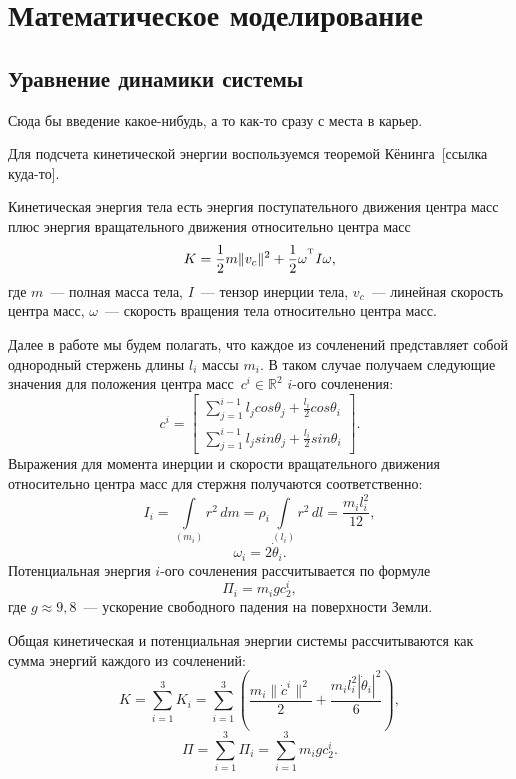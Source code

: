 \section{Математическое моделирование}

\subsection{Уравнение динамики системы}

{\color{red} Сюда бы введение какое-нибудь, а то как-то сразу с места в карьер.}

Для подсчета кинетической энергии воспользуемся теоремой Кёнинга~[ссылка куда-то].
\begin{theorem}[Кёнинг]
    Кинетическая энергия тела есть энергия поступательного движения центра масс плюс энергия вращательного движения относительно центра масс
    \begin{equation}\label{eq:kin-energy}
        K = \frac{1}{2} m \|v_c\|^2 + \frac{1}{2}\omega^{^\mathrm{T}} I \omega,
    \end{equation}
    где $m$~--- полная масса тела, $I$~--- тензор инерции тела, $v_c$~--- линейная скорость центра масс, $\omega$~--- скорость вращения тела относительно центра масс.
\end{theorem}

Далее в работе мы будем полагать, что каждое из сочленений представляет собой однородный стержень длины $l_i$ массы $m_i$.
В таком случае получаем следующие значения для положения центра масс~$c^i \in \mathbb{R}^2$ $i$-ого сочленения:
$$
    c^i =
    \left[\begin{aligned}
        \sum_{j=1}^{i-1} l_j cos\theta_j + \frac{l_i}{2}cos\theta_i \\
        \sum_{j=1}^{i-1} l_j sin\theta_j + \frac{l_i}{2}sin\theta_i
    \end{aligned}\right].
$$
Выражения для момента инерции и скорости вращательного движения относительно центра масс для стержня получаются соответственно:
$$
    I_i = \int\limits_{(m_i)} r^2\,dm = \rho_i\int\limits_{(l_i)} r^2\,dl = \frac{m_il_i^2}{12},
$$
$$
    \omega_i = 2\dot \theta_i.
$$
Потенциальная энергия $i$-ого сочленения рассчитывается по формуле
$$
    \Pi_i = m_i g c^i_2,
$$
где $g \approx 9,\!8$~--- ускорение свободного падения на поверхности Земли.

Общая кинетическая и потенциальная энергии системы рассчитываются как сумма энергий каждого из сочленений:
$$
    K = \sum_{i=1}^{3} K_i = \sum_{i=1}^{3}\left( \frac{m_i \|\dot c^i\|^2}{2} + \frac{m_i l_i^2 |\dot \theta_i|^2}{6} \right),
$$
$$
    \Pi = \sum_{i=1}^{3} \Pi_i = \sum_{i=1}^{3} m_i g c^i_2.
$$

